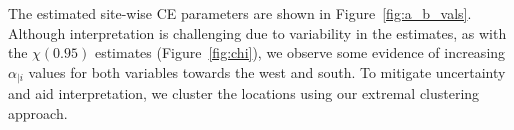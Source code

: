 \documentclass[12pt,compact]{article}
\DeclareMathOperator{\CE}{\mathrm{CE}}
\begin{document}
The estimated site-wise CE parameters are shown in Figure~\ref{fig:a_b_vals}.
Although interpretation is challenging due to variability in the estimates, as with the $\chi(0.95)$ estimates (Figure~\ref{fig:chi}), we observe some evidence of increasing $\alpha_{\mid i}$ values for both variables towards the west and south.
To mitigate uncertainty and aid interpretation, we cluster the locations using our extremal clustering approach. 
\end{document}
